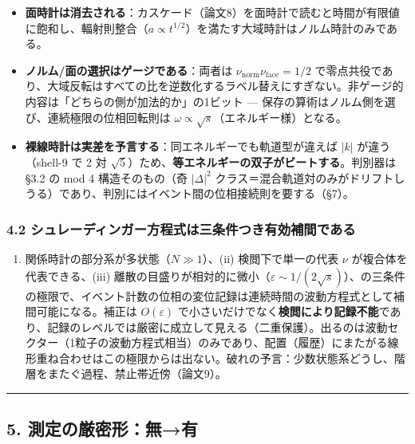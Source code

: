 \documentclass[
]{ltjsarticle}
\providecommand{\tightlist}{%
  \setlength{\itemsep}{0pt}\setlength{\parskip}{0pt}}
\begin{document}
\begin{itemize}
\tightlist
\item
  \textbf{面時計は消去される}：カスケード（論文8）を面時計で読むと時間が有限値に飽和し、輻射則整合（\(a\propto t^{1/2}\)）を満たす大域時計はノルム時計のみである。
\item
  \textbf{ノルム/面の選択はゲージである}：両者は
  \(\nu_{\mathrm{norm}}\nu_{\mathrm{face}}=1/2\)
  で零点共役であり、大域反転はすべての比を逆数化するラベル替えにすぎない。非ゲージ的内容は「どちらの側が加法的か」の1ビット
  --- 保存の算術はノルム側を選び、連続極限の位相回転則は
  \(\omega\propto\sqrt s\)（エネルギー様）となる。
\item
  \textbf{裸線時計は実差を予言する}：同エネルギーでも軌道型が違えば
  \(|k|\) が違う（shell-9 で 2 対
  \(\sqrt5\)）ため、\textbf{等エネルギーの双子がビートする}。判別器は
  §3.2 の mod 4 構造そのもの（奇 \(|\Delta|^2\)
  クラス＝混合軌道対のみがドリフトしうる）であり、判別にはイベント間の位相接続則を要する（§7）。
\end{itemize}

\subsubsection{4.2
シュレーディンガー方程式は三条件つき有効補間である}\label{ux30b7ux30e5ux30ecux30fcux30c7ux30a3ux30f3ux30acux30fcux65b9ux7a0bux5f0fux306fux4e09ux6761ux4ef6ux3064ux304dux6709ux52b9ux88dcux9593ux3067ux3042ux308b}

\begin{enumerate}
\def\labelenumi{(\roman{enumi})}
\tightlist
\item
  関係時計の部分系が多状態（\(N\gg1\)）、(ii) 検閲下で単一の代表 \(\nu\)
  が複合体を代表できる、(iii)
  離散の目盛りが相対的に微小（\(\varepsilon\sim1/(2\sqrt s)\)）、の三条件の極限で、イベント計数の位相の変位記録は連続時間の波動方程式として補間可能になる。補正は
  \(O(\varepsilon)\)
  で小さいだけでなく\textbf{検閲により記録不能}であり、記録のレベルでは厳密に成立して見える（二重保護）。出るのは波動セクター（1粒子の波動方程式相当）のみであり、配置（履歴）にまたがる線形重ね合わせはこの極限からは出ない。破れの予言：少数状態系どうし、階層をまたぐ過程、禁止帯近傍（論文9）。
\end{enumerate}

\begin{center}\rule{0.5\linewidth}{0.5pt}\end{center}

\subsection{5.
測定の厳密形：無→有}\label{ux6e2cux5b9aux306eux53b3ux5bc6ux5f62ux7121ux6709}
\end{document}
